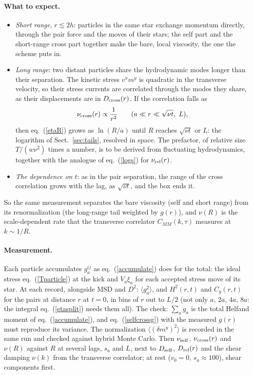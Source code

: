 \documentclass[11pt,aps,preprint,nofootinbib,superscriptaddress,tightenlines]{revtex4-2}
\def\st{\begin{equation}}
\def\stp{\end{equation}}
\def\Eq#1{eq.~(\ref{#1})}
\def\Sect#1{Sect.~\ref{#1}}
\newcommand{\avg}[1]{\langle #1\rangle}
\let\oldparagraph\paragraph
\renewcommand{\paragraph}{\par\bigskip\oldparagraph}
\begin{document}
\paragraph{What to expect.}
\begin{itemize}
\item \emph{Short range}, $r\lesssim2h$: particles in the same star exchange momentum directly, through the pair force and the moves of
  their stars; the self part and the short-range cross part together make the bare, local viscosity, the one the scheme puts in.
\item \emph{Long range}: two distant particles share the hydrodynamic modes longer than their separation.  The kinetic stress
  $v^xm^y$ is quadratic in the transverse velocity, so their stress currents are correlated through the modes they share, as their
  displacements are in $D_{\rm cross}(r)$.  If the correlation falls as
  \st
  \nu_{\rm cross}(r)\propto\frac1{r^2}\qquad(a\ll r\ll\sqrt{\nu t},\ L),
  \stp
  then \Eq{etaR} grows as $\ln(R/a)$ until $R$ reaches $\sqrt{\nu t}$ or $L$: the logarithm of \Sect{sec:tails}, resolved in space.  The prefactor,
  of relative size $T/(w\nu^2)$ times a number, is to be derived from fluctuating hydrodynamics, together with the analogue of \Eq{logs}
  for $\nu_{\rm rel}(r)$.
\item \emph{The dependence on $t$}: as in the pair separation, the range of the cross correlation grows with the lag, as $\sqrt{\nu t}$, and
  the box ends it.
\end{itemize}
So the same measurement separates the bare viscosity (self and short range) from its renormalization (the long-range tail weighted by
$g(r)$), and $\nu(R)$ is the scale-dependent rate that the transverse correlator $C_{MM}(k,\tau)$ measures at $k\sim1/R$.

\paragraph{Measurement.}  Each particle accumulates $g_a^{ij}$ as \Eq{accumulate} does for the total: the ideal stress \Eq{Tparticle} at the kick
and $V_a\xi_a$ for each accepted stress move of its star.  At each record, alongside $\mathrm{MSD}$ and $D^2$: $\avg{g_a^2}$, and $H^2(r,t)$ and
$C_g(r,t)$ for the pairs at distance $r$ at $t=0$, in bins of $r$ out to $L/2$ (not only $a$, $2a$, $4a$, $8a$: the integral \Eq{etasplit} needs them
all).  The check: $\sum_ag_a$ is the total Helfand moment of \Eq{accumulate}, and \Eq{selfcrossg} with the measured $g(r)$ must reproduce its variance.
The normalization $\avg{(\delta m^y)^2}$ is recorded in the same run and checked against hybrid Monte Carlo.  Then $\nu_{\rm self}$, $\nu_{\rm cross}(r)$ and
$\nu(R)$ against $R$ at several lags, $s_a$ and $L$, next to $D_{\rm self}$, $D_{\rm rel}(r)$ and the shear damping $\nu(k)$ from the transverse correlator;
at rest ($v_0=0$, $s_a\approx100$), shear components first.
\end{document}
